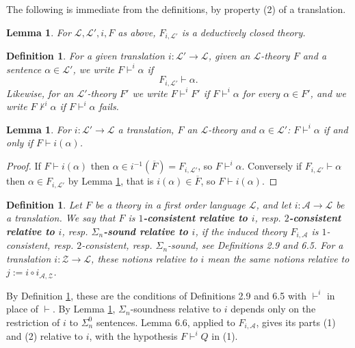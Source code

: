 \documentclass{amsart}  %
\numberwithin{equation}{section}
\newtheorem{lemma}[equation]{Lemma}
\newtheorem{definition}[equation]{Definition}
\theoremstyle{definition}
\theoremstyle{remark}
\begin{document}
The following is immediate from the definitions, by property (2) of a translation.
\begin{lemma} \label{lemma_inducedclosed} For $\mathcal{L}, \mathcal{L}',
i, F$ as above, $F _{i,\mathcal{L}'}$ is a deductively closed
theory.
\end{lemma}
\begin{definition}\label{definition_interprets}
For a given translation $i: \mathcal{L}' \to  \mathcal{L}
$, given an $\mathcal{L} $-theory $F$ and a sentence $\alpha
\in \mathcal{L}'$,  we write $F \vdash ^{i}  \alpha$ if
\begin{equation*}
F _{i,\mathcal{L}'} \vdash \alpha. 
\end{equation*}
Likewise, for an $\mathcal{L}'$-theory $F'$ we write $F \vdash ^{i} F'$ if $F \vdash ^{i} \alpha$ for every $\alpha \in F'$, and we write $F \nvdash ^{i} \alpha$ if $F \vdash ^{i} \alpha$ fails. 
\end{definition}
\begin{lemma} \label{lemma_vdashi}
For $i: \mathcal{L}' \to \mathcal{L}$ a translation, $F$ an $\mathcal{L}$-theory and $\alpha \in \mathcal{L}'$: $F \vdash ^{i} \alpha$ if and only if $F \vdash i (\alpha)$.
\end{lemma}
\begin{proof}
If $F \vdash i (\alpha)$ then $\alpha \in i ^{-1} (\overline{F}) = F _{i, \mathcal{L}'}$, so $F \vdash ^{i} \alpha$. Conversely if $F _{i, \mathcal{L}'} \vdash \alpha$ then $\alpha \in F _{i, \mathcal{L}'}$ by Lemma \ref{lemma_inducedclosed}, that is $i (\alpha) \in \overline{F}$, so $F \vdash i (\alpha)$.
\end{proof}
\begin{definition} \label{definition_relative}
Let $F$ be a theory in a first order language $\mathcal{L}$, and let $i: \mathcal{A} \to \mathcal{L}$ be a translation. We say that $F$ is \textbf{\emph{$1$-consistent relative to $i$}}, resp. \textbf{\emph{$2$-consistent relative to $i$}}, resp. \textbf{\emph{$\Sigma _{n}$-sound relative to $i$}}, if the induced theory $F _{i, \mathcal{A}}$ is $1$-consistent, resp. $2$-consistent, resp. $\Sigma _{n}$-sound, see Definitions 2.9 and 6.5. For a translation $i: \mathcal{Z} \to \mathcal{L}$, these notions relative to $i$ mean the same notions relative to $j := i \circ i _{\mathcal{A}, \mathcal{Z}}$.
\end{definition}
By Definition \ref{definition_interprets}, these are the conditions of Definitions 2.9 and 6.5 with $\vdash ^{i}$ in place of $\vdash$. By Lemma \ref{lemma_vdashi}, $\Sigma _{n}$-soundness relative to $i$ depends only on the restriction of $i$ to $\Sigma ^{0} _{n}$ sentences. Lemma 6.6, applied to $F _{i, \mathcal{A}}$, gives its parts (1) and (2) relative to $i$, with the hypothesis $F \vdash ^{i} Q$ in (1).
\end{document}
